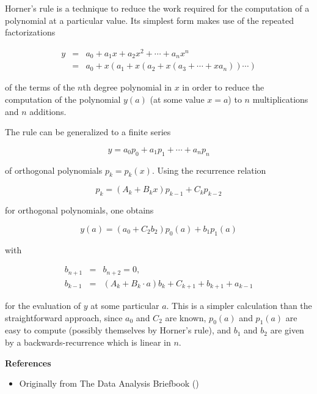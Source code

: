 \documentclass[12pt]{article}
\begin{document}
Horner's rule is a technique to reduce the work required for the computation of a polynomial at a particular value.  Its simplest form makes use of the repeated factorizations 

\begin{eqnarray*} 
 y & = & a_0 + a_1 x + a_2 x^2 + \cdots + a_n x^n \\
   & = & a_0 + x(a_1 + x(a_2 + x(a_3 + \cdots +xa_n)) \cdots ) 
\end{eqnarray*}

of the terms of the $n$th degree polynomial in $x$ in order to reduce the computation of the polynomial $y(a)$ (at some value $x = a$) to $n$ multiplications and $n$ additions.  

The rule can be generalized to a finite series

$$ y = a_0 p_0 + a_1 p_1 + \cdots + a_n p_n $$

of orthogonal polynomials $p_k = p_k(x)$.  Using the recurrence relation

$$ p_k = (A_k + B_k x) p_{k-1} + C_k p_{k-2} $$

for orthogonal polynomials, one obtains 

$$ y(a) = (a_0 + C_2 b_2) p_0(a) + b_1 p_1(a) $$

with 

\begin{eqnarray*}
 b_{n+1} & = & b_{n+2} = 0 , \\
 b_{k-1} & = &  (A_k + B_k\cdot a) b_k + C_{k+1} + b_{k+1} + a_{k-1} 
\end{eqnarray*}

for the evaluation of $y$ at some particular $a$.  This is a simpler calculation than the straightforward approach, since $a_0$ and $C_2$ are known, $p_0(a)$ and $p_1(a)$ are easy to compute (possibly themselves by Horner's rule), and $b_1$ and $b_2$ are given by a backwards-recurrence which is linear in $n$.

{\bf References}

\begin{itemize}
\item Originally from The Data Analysis Briefbook
()
\end{itemize}
\end{document}
